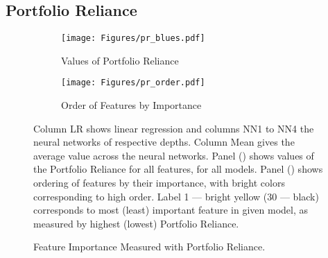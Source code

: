 	
	\subsection{Portfolio Reliance}
	
		\begin{figure}	
			\centering		
			\begin{subfigure}[t]{\textwidth}
				\texttt{[image: Figures/pr\_blues.pdf]}
				\caption{Values of Portfolio Reliance}
				\label{fig:pr_blues}
			\end{subfigure}
			
			\begin{subfigure}[t]{\textwidth}
				\centering
				\texttt{[image: Figures/pr\_order.pdf]}
				\caption{Order of Features by Importance}
				\label{fig:pr_order}
			\end{subfigure}
			\caption{Feature Importance Measured with Portfolio Reliance.}
			\medskip
			\small
			Column LR shows linear regression and columns NN1 to NN4 the neural networks of respective depths. Column Mean gives the average value across the neural networks. Panel () shows values of the Portfolio Reliance for all features, for all models.  Panel () shows ordering of features by their importance, with bright colors corresponding to high order. Label 1 --- bright yellow (30 --- black) corresponds to most (least) important feature in given model, as measured by highest (lowest) Portfolio Reliance. 
			\label{fig:pr_ensemble}
		\end{figure}
		
